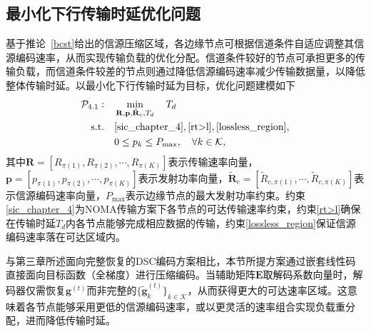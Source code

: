 
\subsection{最小化下行传输时延优化问题}
基于推论~\ref{bcst}给出的信源压缩区域，各边缘节点可根据信道条件自适应调整其信源编码速率，从而实现传输负载的优化分配。信道条件较好的节点可承担更多的传输负载，而信道条件较差的节点则通过降低信源编码速率减少传输数据量，以降低整体传输时延。以最小化下行传输时延为目标，优化问题建模如下
\begin{align}
	\mathcal{P}_{4.1}: \quad & \min_{\mathbf{R},\mathbf{p},\tilde{\mathbf{R}}_c,T_d} \quad T_{d} \\
	\text{s.t.} \quad & \eqref{sic_chapter_4}, \eqref{rt>l}, \eqref{lossless_region}, \notag\\
	& 0 \leq p_k \leq P_{\max}, \quad \forall k\in\mathcal{K}, \label{power_constraint_4.1}
\end{align}
其中$\mathbf{R}=[R_{\pi(1)},R_{\pi(2)},\cdots,R_{\pi(K)}]$表示传输速率向量，$\mathbf{p}=[p_{\pi(1)},p_{\pi(2)},\cdots,p_{\pi(K)}]$表示发射功率向量，$\tilde{\mathbf{R}}_c=[\tilde{R}_{c,\pi(1)},\cdots,\tilde{R}_{c,\pi(K)}]$表示信源编码速率向量，$P_{\max}$表示边缘节点的最大发射功率约束。约束\eqref{sic_chapter_4}为NOMA传输方案下各节点的可达传输速率约束，约束\eqref{rt>l}确保在传输时延$T_d$内各节点能够完成相应数据的传输，约束\eqref{lossless_region}保证信源编码速率落在可达区域内。

  \begin{remark}
	与第三章所述面向完整恢复的DSC编码方案相比，本节所提方案通过嵌套线性码直接面向目标函数（全梯度）进行压缩编码。当辅助矩阵$\mathbf{E}$取解码系数向量时，解码器仅需恢复$\mathbf{g}^{(t)}$而非完整的$\{\tilde{\mathbf{g}}_k^{(t)}\}_{k\in\mathcal{K}}$，从而获得更大的可达速率区域。这意味着各节点能够采用更低的信源编码速率，或以更灵活的速率组合实现负载重分配，进而降低传输时延。
\end{remark}


